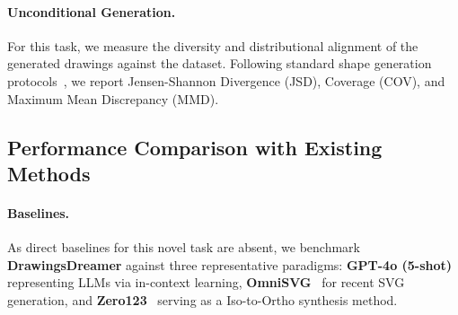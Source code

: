 \documentclass{article}
\begin{document}
\paragraph{Unconditional Generation.} For this task, we measure the diversity and distributional alignment of the generated drawings against the dataset. Following standard shape generation protocols~\cite{wu2021deepcad}, we report Jensen-Shannon Divergence (JSD), Coverage (COV), and Maximum Mean Discrepancy (MMD).


\subsection{Performance Comparison with Existing Methods}
\label{sec:baselines}


\paragraph{Baselines.}
As direct baselines for this novel task are absent, we benchmark \textbf{DrawingsDreamer} against three representative paradigms: \textbf{GPT-4o (5-shot)} representing LLMs via in-context learning, \textbf{OmniSVG}~\cite{yang2025omnisvg} for recent SVG generation, and \textbf{Zero123}~\cite{liu2023zero} serving as a Iso-to-Ortho synthesis method.
\end{document}
